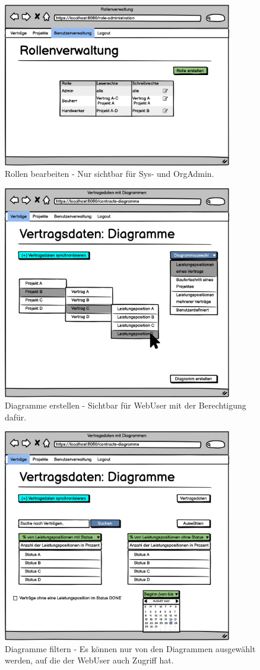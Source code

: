 \begin{figure}[h]
\centering
\includegraphics[width=10cm]{img/mockup_web/admin-roles.png}
\caption{Rollen bearbeiten - Nur sichtbar für Sys- und OrgAdmin.}
\end{figure}

\begin{figure}[h]
\centering
\includegraphics[width=10cm]{img/mockup_web/Erstellung Diagramme.png}
\caption{Diagramme erstellen - Sichtbar für WebUser mit der Berechtigung dafür.}
\end{figure}

\begin{figure}[h]
	\centering
	\includegraphics[width=10cm]{img/mockup_web/Filter Diagramme.png}
	\caption{Diagramme filtern - Es können nur von den Diagrammen ausgewählt werden, auf die der WebUser auch Zugriff hat.}
\end{figure}

